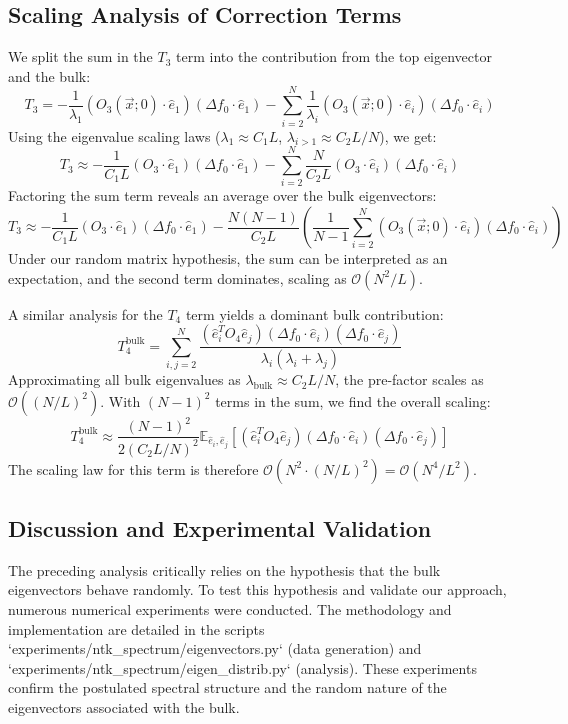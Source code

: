 \documentclass[a4paper]{article}
\begin{document}
\subsection{Scaling Analysis of Correction Terms}
We split the sum in the $T_3$ term into the contribution from the top eigenvector and the bulk:
\[ T_3 = -\frac{1}{\lambda_{1}}(O_{3}(\vec{x};0)\cdot\hat{e}_{1})(\Delta f_{0}\cdot\hat{e}_{1}) - \sum_{i=2}^N\frac{1}{\lambda_{i}}(O_{3}(\vec{x};0)\cdot\hat{e}_{i})(\Delta f_{0}\cdot\hat{e}_{i}) \]
Using the eigenvalue scaling laws ($\lambda_1 \approx C_1 L$, $\lambda_{i>1} \approx C_2 L/N$), we get:
\[ T_3 \approx -\frac{1}{C_1 L}(O_{3}\cdot\hat{e}_{1})(\Delta f_{0}\cdot\hat{e}_{1}) - \sum_{i=2}^N\frac{N}{C_2 L}(O_{3}\cdot\hat{e}_{i})(\Delta f_{0}\cdot\hat{e}_{i}) \]
Factoring the sum term reveals an average over the bulk eigenvectors:
\[ T_3 \approx -\frac{1}{C_1 L}(O_{3}\cdot\hat{e}_{1})(\Delta f_{0}\cdot\hat{e}_{1}) - \frac{N(N-1)}{C_2 L} \left( \frac{1}{N-1} \sum_{i=2}^N (O_{3}(\vec{x};0)\cdot\hat{e}_{i})(\Delta f_{0}\cdot\hat{e}_{i}) \right) \]
Under our random matrix hypothesis, the sum can be interpreted as an expectation, and the second term dominates, scaling as $\mathcal{O}(N^2/L)$.

A similar analysis for the $T_4$ term yields a dominant bulk contribution:
\[ T_4^{\text{bulk}} = \sum_{i,j=2}^N \frac{(\hat{e}_{i}^{T}O_{4}\hat{e}_{j})(\Delta f_{0}\cdot \hat{e}_{i})(\Delta f_{0}\cdot \hat{e}_{j})}{\lambda_i(\lambda_i+\lambda_j)} \]
Approximating all bulk eigenvalues as $\lambda_{\text{bulk}} \approx C_2 L/N$, the pre-factor scales as $\mathcal{O}((N/L)^2)$. With $(N-1)^2$ terms in the sum, we find the overall scaling:
\[ T_4^{\text{bulk}} \approx \frac{(N-1)^2}{2(C_2 L/N)^2} \mathbb{E}_{\hat{e}_i, \hat{e}_j} \left[ (\hat{e}_{i}^{T}O_{4}\hat{e}_{j})(\Delta f_{0}\cdot \hat{e}_{i})(\Delta f_{0}\cdot \hat{e}_{j}) \right] \]
The scaling law for this term is therefore $\mathcal{O}(N^2 \cdot (N/L)^2) = \mathcal{O}(N^4/L^2)$.

\subsection{Discussion and Experimental Validation}
The preceding analysis critically relies on the hypothesis that the bulk eigenvectors behave randomly. To test this hypothesis and validate our approach, numerous numerical experiments were conducted. The methodology and implementation are detailed in the scripts `experiments/ntk_spectrum/eigenvectors.py` (data generation) and `experiments/ntk_spectrum/eigen_distrib.py` (analysis). These experiments confirm the postulated spectral structure and the random nature of the eigenvectors associated with the bulk.
\end{document}
